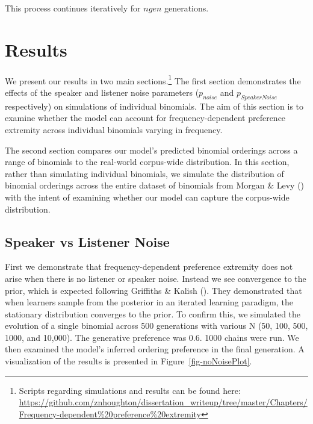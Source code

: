 \documentclass[
  12pt,
  letterpaper,
]{scrreport}
\begin{document}
This process continues iteratively for \(ngen\) generations.

\section{Results}\label{results-10}

We present our results in two main sections.\footnote{Scripts regarding
  simulations and results can be found here:
  \url{https://github.com/znhoughton/dissertation_writeup/tree/master/Chapters/Frequency-dependent\%20preference\%20extremity}}
The first section demonstrates the effects of the speaker and listener
noise parameters (\(p_{noise}\) and \(p_{SpeakerNoise}\) respectively)
on simulations of individual binomials. The aim of this section is to
examine whether the model can account for frequency-dependent preference
extremity across individual binomials varying in frequency.

The second section compares our model's predicted binomial orderings
across a range of binomials to the real-world corpus-wide distribution.
In this section, rather than simulating individual binomials, we
simulate the distribution of binomial orderings across the entire
dataset of binomials from Morgan \& Levy
() with the intent of examining whether
our model can capture the corpus-wide distribution.

\subsection{Speaker vs Listener Noise}\label{speaker-vs-listener-noise}

First we demonstrate that frequency-dependent preference extremity does
not arise when there is no listener or speaker noise. Instead we see
convergence to the prior, which is expected following Griffiths \&
Kalish ().
They demonstrated that when learners sample from the posterior in an
iterated learning paradigm, the stationary distribution converges to the
prior. To confirm this, we simulated the evolution of a single binomial
across 500 generations with various N (50, 100, 500, 1000, and 10,000).
The generative preference was 0.6. 1000 chains were run. We then
examined the model's inferred ordering preference in the final
generation. A visualization of the results is presented in
Figure~\ref{fig-noNoisePlot}.
\end{document}
